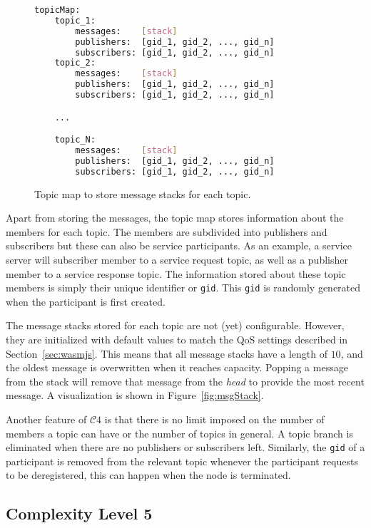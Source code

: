         \begin{figure}[htbp]
            \centering
            \begin{lstlisting}[language=Bash]
topicMap:
    topic_1:
        messages:    [stack]
        publishers:  [gid_1, gid_2, ..., gid_n]
        subscribers: [gid_1, gid_2, ..., gid_n]
    topic_2:
        messages:    [stack]
        publishers:  [gid_1, gid_2, ..., gid_n]
        subscribers: [gid_1, gid_2, ..., gid_n]

    ...

    topic_N:
        messages:    [stack]
        publishers:  [gid_1, gid_2, ..., gid_n]
        subscribers: [gid_1, gid_2, ..., gid_n]
\end{lstlisting}
            \caption{Topic map to store message stacks for each topic.}
            \label{fig:topicMap}
        \end{figure}

        Apart from storing the messages, the topic map stores information about the members for each topic. The members are subdivided into publishers and subscribers but these can also be service participants. As an example, a service server will subscriber member to a service request topic, as well as a publisher member to a service response topic. The information stored about these topic members is simply their unique identifier or \texttt{gid}. This \texttt{gid} is randomly generated when the participant is first created. 

        The message stacks stored for each topic are not (yet) configurable. However, they are initialized with default values to match the \ac{QoS} settings described in Section~\ref{sec:wasmjs}. This means that all message stacks have a length of $10$, and the oldest message is overwritten when it reaches capacity. Popping a message from the stack will remove that message from the \textit{head} to provide the most recent message. A visualization is shown in Figure~\ref{fig:msgStack}.

        Another feature of $\mathcal{C}4$ is that there is no limit imposed on the number of members a topic can have or the number of topics in general. A topic branch is eliminated when there are no publishers or subscribers left. Similarly, the \texttt{gid} of a participant is removed from the relevant topic whenever the participant requests to be deregistered, this can happen when the node is terminated. 


        \subsection{Complexity Level 5}

